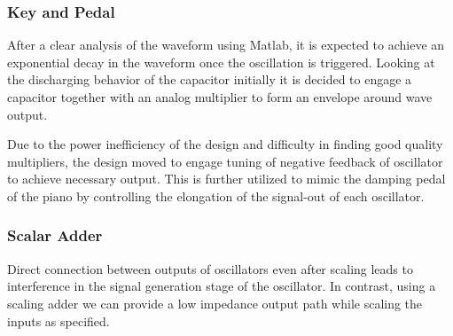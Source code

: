 \subsubsection{Key and Pedal}
After a clear analysis of the waveform using Matlab, it is expected to achieve an exponential decay in the waveform once the oscillation is triggered. Looking at the discharging behavior of the capacitor initially it is decided to engage a capacitor together with an analog multiplier to form an envelope around wave output.
\par
Due to the power inefficiency of the design and difficulty in finding good quality multipliers, the design moved to engage tuning of negative feedback of oscillator to achieve necessary output. This is further utilized to mimic the damping pedal of the piano by controlling the elongation of the signal-out of each oscillator.
\subsubsection{Scalar Adder}
Direct connection between outputs of oscillators even after scaling leads to interference in the signal generation stage of the oscillator. In contrast, using a scaling adder we can provide a low impedance output path while scaling the inputs as specified.
